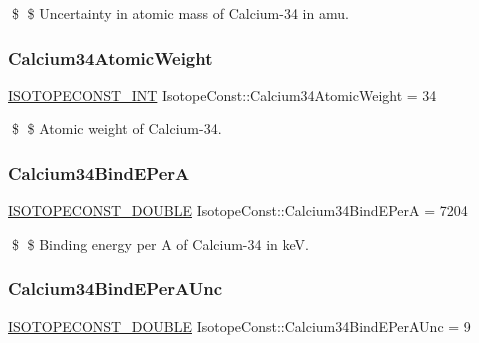 \$ \$ Uncertainty in atomic mass of Calcium-\/34 in amu. \mbox{\label{group___isotope_const-_calcium-_ca34_ga920f9810bf7ef2222634a4a65a197c4d}} 
\subsubsection{\texorpdfstring{Calcium34\+Atomic\+Weight}{Calcium34AtomicWeight}}
{\footnotesize\ttfamily \mbox{\hyperlink{group___isotope_const-_macros_ga5f18360b3e99483a35c32d789e62621c}{I\+S\+O\+T\+O\+P\+E\+C\+O\+N\+S\+T\+\_\+\+I\+NT}} Isotope\+Const\+::\+Calcium34\+Atomic\+Weight = 34}

\$ \$ Atomic weight of Calcium-\/34. \mbox{\label{group___isotope_const-_calcium-_ca34_ga7ee43b0560f9b77c8fc594333c5a5f28}} 
\subsubsection{\texorpdfstring{Calcium34\+Bind\+E\+PerA}{Calcium34BindEPerA}}
{\footnotesize\ttfamily \mbox{\hyperlink{group___isotope_const-_macros_ga8f45a7272ce02c0b4c65c44636ed719a}{I\+S\+O\+T\+O\+P\+E\+C\+O\+N\+S\+T\+\_\+\+D\+O\+U\+B\+LE}} Isotope\+Const\+::\+Calcium34\+Bind\+E\+PerA = 7204}

\$ \$ Binding energy per A of Calcium-\/34 in keV. \mbox{\label{group___isotope_const-_calcium-_ca34_ga810129adbe3baa13c6fe9bb0d39de792}} 
\subsubsection{\texorpdfstring{Calcium34\+Bind\+E\+Per\+A\+Unc}{Calcium34BindEPerAUnc}}
{\footnotesize\ttfamily \mbox{\hyperlink{group___isotope_const-_macros_ga8f45a7272ce02c0b4c65c44636ed719a}{I\+S\+O\+T\+O\+P\+E\+C\+O\+N\+S\+T\+\_\+\+D\+O\+U\+B\+LE}} Isotope\+Const\+::\+Calcium34\+Bind\+E\+Per\+A\+Unc = 9}

